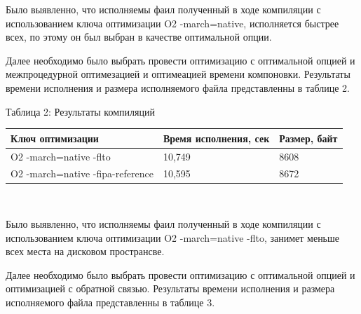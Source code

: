 \documentclass[12pt,a4paper]{scrartcl}
\begin{document}
\par
Было выявленно, что исполняемы фаил полученный в ходе компиляции с использованием ключа оптимизации
O2 -march=native, исполняется быстрее всех, по этому он был выбран в качестве оптимальной опции.
\par
Далее необходимо было выбрать провести оптимизацию с оптимальной опцией и межпроцедурной оптимезацией и
оптимеацией времени компоновки. Результаты времени исполнения и размера исполняемого файла представленны в
 таблице 2.

\begin{center}
\caption{Таблица 2: Результаты компиляций}
\begin{tabular}{| l | l | l |}
\hline
Ключ оптимизации & Время исполнения, сек & Размер, байт  \\ \hline
O2 -march=native -flto&	10,749	&8608\\
O2 -march=native -fipa-reference&	10,595	&8672\\
\hline
\end{tabular}\\
\end{center}
Было выявленно, что исполняемы фаил полученный в ходе компиляции с использованием ключа оптимизации
O2 -march=native -flto, занимет меньше всех места на дисковом пространсве.
\par

Далее необходимо было выбрать провести оптимизацию с оптимальной опцией и оптимизацией с обратной
связью. Результаты времени исполнения и размера исполняемого файла представленны в таблице 3.
\end{document}
